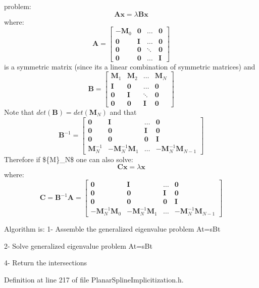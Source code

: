 problem\+: \[ \mathbf{A}\mathbf{x}=\lambda\mathbf{B}\mathbf{x} \] where\+: \[ \mathbf{A}=\left[\begin{array}{cccc} -\mathbf{M}_0& \mathbf{0}& \ldots& \mathbf{0}\\ \mathbf{0}& \mathbf{I}& \ldots& \mathbf{0}\\ \mathbf{0}& \mathbf{0}& \ddots& \mathbf{0}\\ \mathbf{0}& \mathbf{0}& \ldots& \mathbf{I} \end{array}\right] \] is a symmetric matrix (since it\textquotesingle{}s a linear combination of symmetric matrices) and \[ \mathbf{B}=\left[\begin{array}{cccc} \mathbf{M}_1& \mathbf{M}_2& \ldots& \mathbf{M}_N\\ \mathbf{I}& \mathbf{0}& \ldots& \mathbf{0}\\ \mathbf{0}& \mathbf{I}& \ddots& \mathbf{0}\\ \mathbf{0}& \mathbf{0}& \mathbf{I}& \mathbf{0} \end{array}\right] \] Note that $det(\mathbf{B})=det(\mathbf{M}_N)$ and that \[ \mathbf{B}^{-1}=\left[\begin{array}{cccc} \mathbf{0}& \mathbf{I}& \ldots& \mathbf{0}\\ \mathbf{0}& \mathbf{0}& \mathbf{I}& \mathbf{0}\\ \mathbf{0}& \mathbf{0}& \mathbf{0}& \mathbf{I}\\ \mathbf{M}_N^{-1}& -\mathbf{M}_N^{-1}\mathbf{M}_1& \ldots& -\mathbf{M}_N^{-1}\mathbf{M}_{N-1} \end{array}\right] \] Therefore if \$\{M\}\+\_\+\+N\$ one can also solve\+: \[ \mathbf{C}\mathbf{x}=\lambda\mathbf{x} \] where\+: \[ \mathbf{C}=\mathbf{B}^{-1}\mathbf{A}=\left[\begin{array}{cccc} \mathbf{0}& \mathbf{I}& \ldots& \mathbf{0}\\ \mathbf{0}& \mathbf{0}& \mathbf{I}& \mathbf{0}\\ \mathbf{0}& \mathbf{0}& \mathbf{0}& \mathbf{I}\\ -\mathbf{M}_N^{-1}\mathbf{M}_0& -\mathbf{M}_N^{-1}\mathbf{M}_1& \ldots& -\mathbf{M}_N^{-1}\mathbf{M}_{N-1} \end{array}\right] \]

Algorithm is\+: 1-\/ Assemble the generalized eigenvalue problem At=s\+Bt

2-\/ Solve generalized eigenvalue problem At=s\+Bt

4-\/ Return the intersections 

Definition at line 217 of file Planar\+Spline\+Implicitization.\+h.



